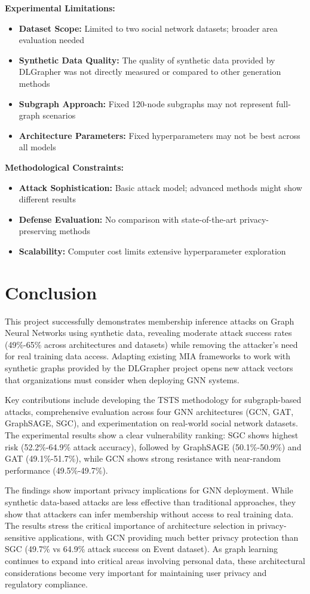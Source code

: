 \documentclass{article}
\begin{document}
\textbf{Experimental Limitations:}
\begin{itemize}
\item \textbf{Dataset Scope:} Limited to two social network datasets; broader area evaluation needed
\item \textbf{Synthetic Data Quality:} The quality of synthetic data provided by DLGrapher was not directly measured or compared to other generation methods
\item \textbf{Subgraph Approach:} Fixed 120-node subgraphs may not represent full-graph scenarios
\item \textbf{Architecture Parameters:} Fixed hyperparameters may not be best across all models
\end{itemize}

\textbf{Methodological Constraints:}
\begin{itemize}
\item \textbf{Attack Sophistication:} Basic attack model; advanced methods might show different results
\item \textbf{Defense Evaluation:} No comparison with state-of-the-art privacy-preserving methods
\item \textbf{Scalability:} Computer cost limits extensive hyperparameter exploration
\end{itemize}

\section{Conclusion}
This project successfully demonstrates membership inference attacks on Graph Neural Networks using synthetic data, revealing moderate attack success rates (49\%-65\% across architectures and datasets) while removing the attacker's need for real training data access. Adapting existing MIA frameworks to work with synthetic graphs provided by the DLGrapher project opens new attack vectors that organizations must consider when deploying GNN systems.

Key contributions include developing the TSTS methodology for subgraph-based attacks, comprehensive evaluation across four GNN architectures (GCN, GAT, GraphSAGE, SGC), and experimentation on real-world social network datasets. The experimental results show a clear vulnerability ranking: SGC shows highest risk (52.2\%-64.9\% attack accuracy), followed by GraphSAGE (50.1\%-50.9\%) and GAT (49.1\%-51.7\%), while GCN shows strong resistance with near-random performance (49.5\%-49.7\%).

The findings show important privacy implications for GNN deployment. While synthetic data-based attacks are less effective than traditional approaches, they show that attackers can infer membership without access to real training data. The results stress the critical importance of architecture selection in privacy-sensitive applications, with GCN providing much better privacy protection than SGC (49.7\% vs 64.9\% attack success on Event dataset). As graph learning continues to expand into critical areas involving personal data, these architectural considerations become very important for maintaining user privacy and regulatory compliance.
\end{document}
